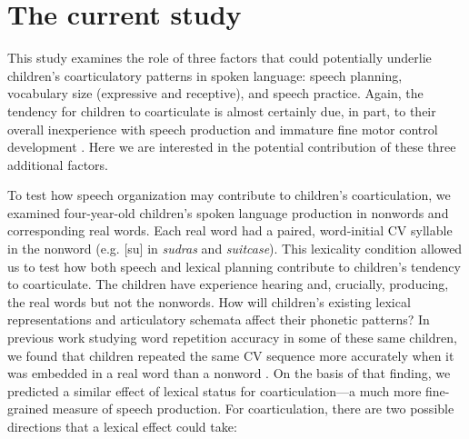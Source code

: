 \documentclass[a4paper,man,natbib,donotrepeattitle, apacite]{apa6}
\begin{document}
\section{The current study}

This study examines the role of three factors that could potentially underlie children’s coarticulatory patterns in spoken language: speech planning, vocabulary size (expressive and receptive), and speech practice. Again, the tendency for children to coarticulate is almost certainly due, in part, to their overall inexperience with speech production and immature fine motor control development \cite{barbierWhatAnticipatoryCoarticulation2020,goffmanRelationsSegmentalMotor2007,greenPhysiologicDevelopmentSpeech2000,rubertusDevelopmentGesturalOrganization2018,zharkovaDynamicsVoicelessSibilant2018}. Here we are interested in the potential contribution of these three additional factors.

To test how speech organization may contribute to children’s coarticulation, we examined four-year-old children’s spoken language production in nonwords and corresponding real words. Each real word had a paired, word-initial CV syllable in the nonword (e.g. [su] in \textit{sudras} and \textit{suitcase}). This lexicality condition allowed us to test how both speech and lexical planning contribute to children’s tendency to coarticulate. The children have experience hearing and, crucially, producing, the real words but not the nonwords. How will children’s existing lexical representations and articulatory schemata affect their phonetic patterns? In previous work studying word repetition accuracy in some of these same children, we found that children repeated the same CV sequence more accurately when it was embedded in a real word than a nonword \cite{cychoszLexicalAdvantageFouryearold2020}. On the basis of that finding, we predicted a similar effect of lexical status for coarticulation---a much more fine-grained measure of speech production. For coarticulation, there are two possible directions that a lexical effect could take: 
\end{document}

